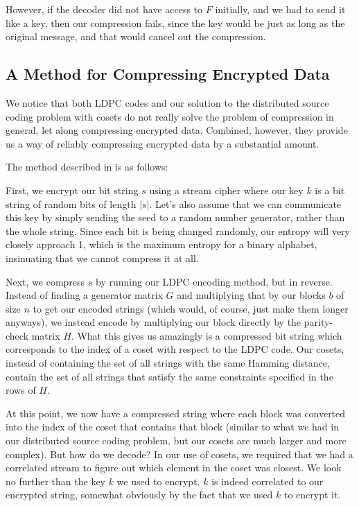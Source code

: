 \documentclass[11pt]{article}
\begin{document}
However, if the decoder did not have access to $F$ initially, and we had to send it like a key, 
then our compression fails, since the key would be just as long as the original message, 
and that would cancel out the compression. 

\subsection{A Method for Compressing Encrypted Data}\label{method-ce-subsect}
We notice that both LDPC codes and our solution to the distributed source coding problem with cosets do 
not really solve the problem of compression in general, let along compressing encrypted data. 
Combined, however, they provide us a way of reliably compressing encrypted data by a substantial amount. 

The method described in \cite{johnson} is as follows:

First, we encrypt our bit string $s$ using a stream cipher where our key $k$ is a bit string of 
random bits of length $|s|$. Let's also assume that we can communicate this key by simply sending 
the seed to a random number generator, rather than the whole string. 
Since each bit is being changed randomly, our entropy will very closely approach 1, which 
is the maximum entropy for a binary alphabet, insinuating that we cannot compress it at all. 

Next, we compress $s$ by running our LDPC encoding method, but in reverse.
Instead of finding a generator matrix $G$ and multiplying that by our blocks $b$ of size $n$ 
to get our encoded strings (which would, of course, just make them longer anyways), 
we instead encode by multiplying our block directly by the parity-check matrix $H$. 
What this gives us amazingly is a compressed bit string which corresponds to the index of a coset 
with respect to the LDPC code. Our cosets, instead of containing the set of all strings with the same 
Hamming distance, contain the set of all strings that satisfy the same constraints specified 
in the rows of $H$. 

At this point, we now have a compressed string where each block was converted into the index 
of the coset that contains that block (similar to what we had in our distributed source coding problem, 
but our cosets are much larger and more complex). But how do we decode? In our use of cosets, we required 
that we had a correlated stream to figure out which element in the coset was closest. 
We look no further than the key $k$ we used to encrypt. $k$ is indeed correlated to our encrypted string, 
somewhat obviously by the fact that we used $k$ to encrypt it. 
\end{document}

